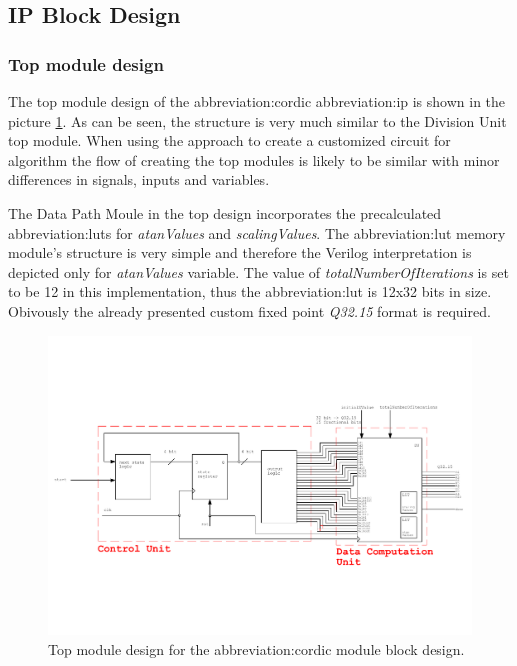 \documentclass[a4paper, twoside, 11pt]{article}
\newcommand{\fbar}{\FloatBarrier}
\begin{document}
    \fbar
    \subsection{IP Block Design}
    \fbar
        \subsubsection{Top module design}
            The top module design of the \gls{abbreviation:cordic} \gls{abbreviation:ip} is shown in the picture \ref{fig:cordic-top-module}. As can be seen, the structure is very much similar to the Division Unit top module. When using the approach to create a customized circuit for algorithm the flow of creating the top modules is likely to be similar with minor differences in signals, inputs and variables.\par
            The Data Path Moule in the top design incorporates the precalculated \gls{abbreviation:lut}s for \textit{atanValues} and \textit{scalingValues}. The \gls{abbreviation:lut} memory module's structure is very simple and therefore the Verilog interpretation is depicted only for \textit{atanValues} variable. The value of \textit{totalNumberOfIterations} is set to be 12 in this implementation, thus the \gls{abbreviation:lut} is 12x32 bits in size. Obivously the already presented custom fixed point \textit{Q32.15} format is required.
            \begin{figure}[htbp!]
                \centering
                \includegraphics[width=1\textwidth]{src/pdf/cordic-top-module.pdf}
                \caption{Top module design for the \gls{abbreviation:cordic} module block design.}
                \label{fig:cordic-top-module}
            \end{figure}
        \fbar
\end{document}
